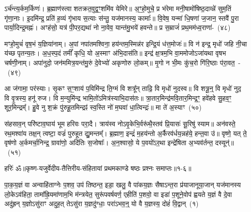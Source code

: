 ऽर्च॑न्त्य॒र्कम॒र्किणः॑। ब्र॒ह्माण॑स्त्वा शतक्रत॒वुद्व॒ꣳ॒शमि॑व येमिरे॥ अ॒ꣳ॒हो॒मुचे॒ प्र भ॑रेमा मनी॒षामो॑षिष्ठ॒दाव्न्ने॑ सुम॒तिं गृ॑णा॒नाः। इ॒दमि॑न्द्र॒ प्रति॑ ह॒व्यं गृ॑भाय स॒त्याः स॑न्तु॒ यज॑मानस्य॒ कामाः᳚॥ वि॒वेष॒ यन्मा॑ धि॒षणा॑ ज॒जान॒ स्तवै॑ पु॒रा पार्या॒दिन्द्र॒मह्नः॑। अꣳह॑सो॒ यत्र॑ पी॒पर॒द्यथा॑ नो ना॒वेव॒ यान्त॑मु॒भये॑ हवन्ते॥ प्र स॒म्राजं॑ प्रथ॒मम॑ध्व॒राणा॑-~(४८)

मꣳहो॒मुचं॑ वृष॒भं य॒ज्ञिया॑नाम्। अ॒पां नपा॑तमश्विना॒ हय॑न्तम॒स्मिन्न॑र इन्द्रि॒यं ध॑त्त॒मोजः॑॥ वि न॑ इन्द्र॒ मृधो॑ जहि नी॒चा य॑च्छ पृतन्य॒तः। अ॒ध॒स्प॒दं तमीं᳚ कृधि॒ यो अ॒स्माꣳ अ॑भि॒दास॑ति॥ इन्द्र॑ क्ष॒त्रम॒भि वा॒ममोजो\-ऽजा॑यथा वृषभ चर्\mbox{}षणी॒नाम्। अपा॑नुदो॒ जन॑ममित्र॒यन्त॑मु॒रुं दे॒वेभ्यो॑ अकृणोरु लो॒कम्॥ मृ॒गो न भी॒मः कु॑च॒रो गि॑रि॒ष्ठाः प॑रा॒वत॒~-~(४९)

आ ज॑गामा॒ पर॑स्याः। सृ॒कꣳ स॒ꣳ॒शाय॑ प॒विमि॑न्द्र ति॒ग्मं वि शत्रू᳚न् ताढि॒ वि मृधो॑ नुदस्व॥ वि शत्रू॒न्॒ वि मृधो॑ नुद॒ वि वृ॒त्रस्य॒ हनू॑ रुज। वि म॒न्युमि॑न्द्र भामि॒तो॑\-ऽमित्र॑स्याभि॒दास॑तः॥ त्रा॒तार॒मिन्द्र॑मवि॒तार॒मिन्द्र॒ꣳ॒ हवे॑हवे सु॒हव॒ꣳ॒ शूर॒मिन्द्रम्᳚। हु॒वे नु श॒क्रं पु॑रुहू॒तमिन्द्रꣴ॑ स्व॒स्ति नो॑ म॒घवा॑ धा॒त्विन्द्रः॑॥ मा ते॑ अ॒स्याꣳ~(५०)

स॑हसाव॒न् परि॑ष्टाव॒घाय॑ भूम हरिवः परा॒दै। त्राय॑स्व नो\-ऽवृ॒केभि॒र्वरू॑थै॒स्तव॑ प्रि॒यासः॑ सू॒रिषु॑ स्याम॥ अन॑वस्ते॒ रथ॒मश्वा॑य तक्ष॒न् त्वष्टा॒ वज्रं॑ पुरुहूत द्यु॒मन्तम्᳚। ब्र॒ह्माण॒ इन्द्रं॑ म॒हय॑न्तो अ॒र्कैरव॑र्धय॒न्नह॑ये॒ हन्त॒वा उ॑॥ वृष्णे॒ यत् ते॒ वृष॑णो अ॒र्कमर्चा॒निन्द्र॒ ग्रावा॑णो॒ अदि॑तिः स॒जोषाः᳚। अ॒न॒श्वासो॒ ये प॒वयो॑\-ऽर॒था इन्द्रे॑षिता अ॒भ्यव॑र्तन्त॒ दस्यून्॑॥~(५१)

{\anuvakamend[{वृ॒त्र॒हत्ये\-ऽनु॑ गाय॒त्रिणो᳚\-ऽध्व॒राणां᳚ परा॒वतो॒\-ऽस्याम॒ष्टाच॑त्वारिꣳशच्च}]}%

{हरिः॑ ॐ}{॥कृष्ण-यजुर्वेदीय-तैत्तिरीय-संहितायां प्रथमकाण्डे षष्ठः प्रश्नः समाप्तः॥१-६॥}

\setcounter{anuvakam}{0}
पा॒क॒य॒ज्ञं वा अन्वाहि॑ताग्नेः प॒शव॒ उप॑ तिष्ठन्त॒ इडा॒ खलु॒ वै पा॑कय॒ज्ञः सैषा\-ऽन्त॒रा प्र॑याजानूया॒जान् यज॑मानस्य लो॒के\-ऽव॑हिता॒ तामा᳚ह्रि॒यमा॑णाम॒भि म॑न्त्रयेत॒ सुरू॑पवर्\mbox{}षवर्ण॒ एहीति॑ प॒शवो॒ वा इडा॑ प॒शूने॒वोप॑ ह्वयते य॒ज्ञं वै दे॒वा अदु॑ह्रन् य॒ज्ञो\-ऽसु॑राꣳ अदुह॒त् ते\-ऽसु॑रा य॒ज्ञदु॑ग्धाः॒ परा॑\-ऽभव॒न्॒ यो वै य॒ज्ञस्य॒ दोहं॑ वि॒द्वान्~(१)

